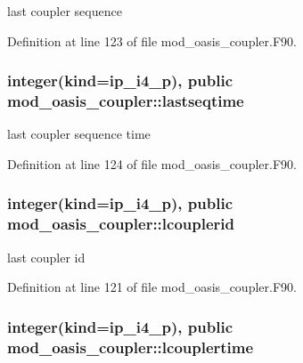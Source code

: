 last coupler sequence 



Definition at line 123 of file mod\+\_\+oasis\+\_\+coupler.\+F90.

\hypertarget{classmod__oasis__coupler_a47f4727f94719892d837f6a1545d3d08}{
\subsubsection[{lastseqtime}]{\setlength{\rightskip}{0pt plus 5cm}integer(kind=ip\+\_\+i4\+\_\+p), public mod\+\_\+oasis\+\_\+coupler\+::lastseqtime}}\label{classmod__oasis__coupler_a47f4727f94719892d837f6a1545d3d08}


last coupler sequence time 



Definition at line 124 of file mod\+\_\+oasis\+\_\+coupler.\+F90.

\hypertarget{classmod__oasis__coupler_a2e4d905b50abb50cea9382a8b58e3e0c}{
\subsubsection[{lcouplerid}]{\setlength{\rightskip}{0pt plus 5cm}integer(kind=ip\+\_\+i4\+\_\+p), public mod\+\_\+oasis\+\_\+coupler\+::lcouplerid}}\label{classmod__oasis__coupler_a2e4d905b50abb50cea9382a8b58e3e0c}


last coupler id 



Definition at line 121 of file mod\+\_\+oasis\+\_\+coupler.\+F90.

\hypertarget{classmod__oasis__coupler_a477b53431b7aa1d2b311a78e5db7f00f}{
\subsubsection[{lcouplertime}]{\setlength{\rightskip}{0pt plus 5cm}integer(kind=ip\+\_\+i4\+\_\+p), public mod\+\_\+oasis\+\_\+coupler\+::lcouplertime}}\label{classmod__oasis__coupler_a477b53431b7aa1d2b311a78e5db7f00f}


